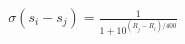 \documentclass[preview]{standalone}
\begin{document}
\begin{align*}
\sigma(s_i - s_j) = \frac{1}{1+10^{(R_j - R_i)/400}}
\end{align*}
\end{document}
